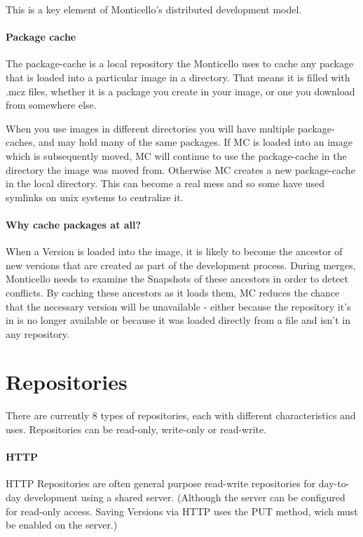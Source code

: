 \documentclass[a4paper,10pt,twoside]{book}
\begin{document}
This is a key element of Monticello's distributed development model.

\paragraph{Package cache}

The package-cache is a local repository the Monticello uses to cache any package that is loaded into a particular image in a directory. That means it is filled with .mcz files, whether it is a package you create in your image, or one you download from somewhere else.

When you use images in different directories you will have multiple package-caches, and may hold many of the same packages. If MC is loaded into an image which is subsequently moved, MC will continue to use the package-cache in the directory the image was moved from. Otherwise MC creates a new package-cache in the local directory. This can become a real mess and so some have used symlinks on unix systems to centralize it.

\paragraph{Why cache packages at all?}

When a Version is loaded into the image, it is likely to become the ancestor of new versions that are created as part of the development process. During merges, Monticello needs to examine the Snapshots of these ancestors in order to detect conflicts. By caching these ancestors as it loads them, MC reduces the chance that the necessary version will be unavailable - either because the repository it's in is no longer available or because it was loaded directly from a file and isn't in any repository.



\section{Repositories}

There are currently 8 types of repositories, each with different characteristics and uses. Repositories can be read-only, write-only or read-write.

\paragraph{HTTP}

HTTP Repositories are often general purpose read-write repositories for day-to-day development using a shared server. (Although the server can be configured for read-only access. Saving Versions via HTTP uses the PUT method, wich must be enabled on the server.)
\end{document}
